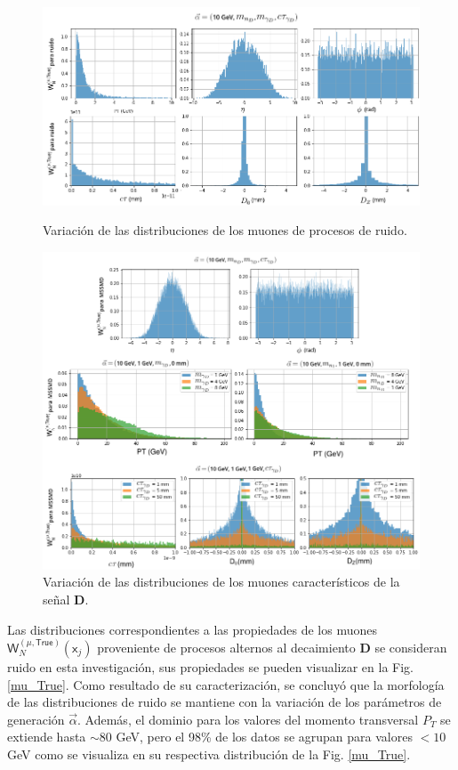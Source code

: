 \begin{figure}[!t]
\centering
\includegraphics[width=.9\textwidth]{Cap4/imagenes/propiedades_True_notMSSM.png}
\caption{Variación de las distribuciones de los muones de procesos de ruido.}
\label{mu_True}

\includegraphics[width=.9\textwidth]{Cap4/imagenes/propiedades_True_MSSM.png}
\caption{Variación de las distribuciones de los muones característicos de la señal \MSSM\textbf{D}.}
\label{mu_True2}
\end{figure}

Las distribuciones correspondientes a las propiedades de los muones $\textsf{W}^{(\mu,\textsf{True})}_N (\textsf{x}_j)$ proveniente de procesos alternos al decaimiento  \MSSM\textbf{D} se consideran ruido en esta investigación, sus propiedades se pueden visualizar en la Fig. \ref{mu_True}. Como resultado de su caracterización, se concluyó que la morfología de las distribuciones de ruido se mantiene con la variación de los parámetros de generación $\vec{\alpha}$. Además, el dominio para los valores del momento transversal $P_T$ se extiende hasta $\sim 80$ GeV, pero el 98\% de los datos se agrupan para valores $<10$ GeV como se visualiza en su respectiva distribución de la Fig. \ref{mu_True}.



